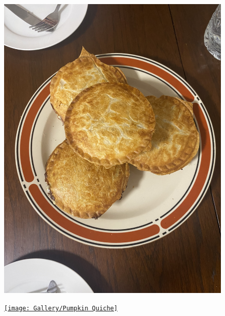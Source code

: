 \documentclass[]{article}
\begin{document}
\newpage\begin{figure}[H]
\begin{center}\hyperref[rec:Bechamel Pie]{\includegraphics[keepaspectratio,width=\textheight,height=\textwidth,angle=-90]{Gallery/Bechamel Pie}}\caption*{}\label{fig:Bechamel Pie}\end{center}
\end{figure}
\newpage\begin{figure}[H]
\begin{center}\hyperref[rec:Pumpkin Quiche]{\texttt{[image: Gallery/Pumpkin Quiche]}}\caption*{}\label{fig:Pumpkin Quiche}\end{center}
\end{figure}
\end{document}
